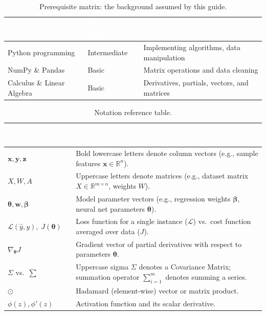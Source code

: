\documentclass[11pt,a4paper]{article}
\begin{document}
	\begin{table}[ht]
		\centering
		\small\sffamily
		\renewcommand{\arraystretch}{1.35}
		\begin{tabular}{@{}L{4.4cm} L{3.6cm} L{6.4cm}@{}}
			\toprule
			\textcolor{white}{\textbf{Skill}} &
			\textcolor{white}{\textbf{Required level}} &
			\textcolor{white}{\textbf{Primary use case}} \\
			\midrule
			Python programming & Intermediate & Implementing algorithms, data manipulation \\
			NumPy \& Pandas & Basic & Matrix operations and data cleaning \\
			Calculus \& Linear Algebra & Basic & Derivatives, partials, vectors, and matrices \\
			\bottomrule
		\end{tabular}
		\caption{Prerequisite matrix: the background assumed by this guide.}
		\label{tab:prereq}
	\end{table}
	
	\begin{table}[ht]
		\centering
		\small\sffamily
		\renewcommand{\arraystretch}{1.3}
		\caption{Notation reference table.}
		\begin{tabular}{@{}L{3.5cm} L{11.3cm}@{}}
			\toprule
			\textcolor{white}{\textbf{Symbol / Notation}} & \textcolor{white}{\textbf{Description and Typical Context}} \\
			\midrule
			$\mathbf{x}, \mathbf{y}, \mathbf{z}$ & Bold lowercase letters denote column vectors (e.g., sample features $\mathbf{x} \in \mathbb{R}^n$). \\
			$X, W, A$ & Uppercase letters denote matrices (e.g., dataset matrix $X \in \mathbb{R}^{m \times n}$, weights $W$). \\
			$\boldsymbol{\theta}, \mathbf{w}, \boldsymbol{\beta}$ & Model parameter vectors (e.g., regression weights $\boldsymbol{\beta}$, neural net parameters $\boldsymbol{\theta}$). \\
			$\mathcal{L}(\hat{y}, y),\; J(\boldsymbol{\theta})$ & Loss function for a single instance ($\mathcal{L}$) vs.\ cost function averaged over data ($J$). \\
			$\nabla_{\!\boldsymbol{\theta}} J$ & Gradient vector of partial derivatives with respect to parameters $\boldsymbol{\theta}$. \\
			$\Sigma$ vs.\ $\sum$ & Uppercase sigma $\Sigma$ denotes a Covariance Matrix; summation operator $\sum_{i=1}^m$ denotes summing a series. \\
			$\odot$ & Hadamard (element-wise) vector or matrix product. \\
			$\phi(z), \phi'(z)$ & Activation function and its scalar derivative. \\
			\bottomrule
		\end{tabular}
		\label{tab:notation}
	\end{table}
	
\end{document}
